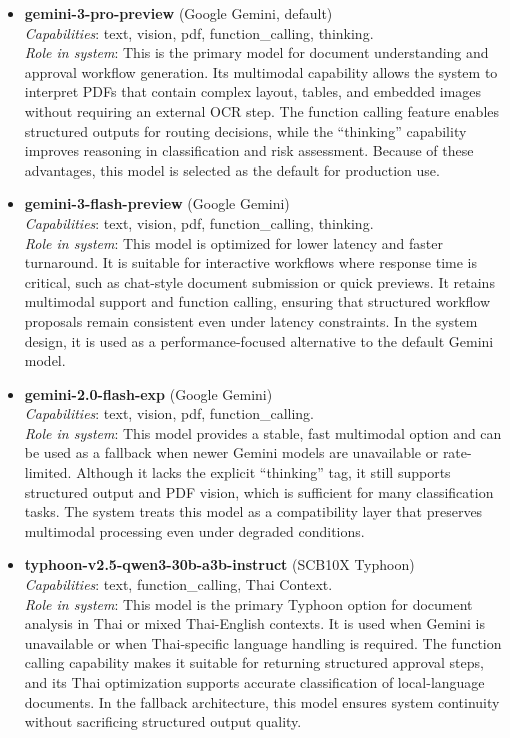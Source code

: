 \documentclass[12pt,oneside,openright,a4paper]{cpe-english-project}
\begin{document}
\begin{itemize}
  \item \textbf{gemini-3-pro-preview} (Google Gemini, default) \\
  \emph{Capabilities}: text, vision, pdf, function\_calling, thinking. \\
  \emph{Role in system}: This is the primary model for document
  understanding and approval workflow generation. Its multimodal
  capability allows the system to interpret PDFs that contain complex
  layout, tables, and embedded images without requiring an external OCR
  step. The function calling feature enables structured outputs for
  routing decisions, while the “thinking” capability improves reasoning
  in classification and risk assessment. Because of these advantages,
  this model is selected as the default for production use.

  \item \textbf{gemini-3-flash-preview} (Google Gemini) \\
  \emph{Capabilities}: text, vision, pdf, function\_calling, thinking. \\
  \emph{Role in system}: This model is optimized for lower latency and
  faster turnaround. It is suitable for interactive workflows where
  response time is critical, such as chat-style document submission or
  quick previews. It retains multimodal support and function calling,
  ensuring that structured workflow proposals remain consistent even
  under latency constraints. In the system design, it is used as a
  performance-focused alternative to the default Gemini model.

  \item \textbf{gemini-2.0-flash-exp} (Google Gemini) \\
  \emph{Capabilities}: text, vision, pdf, function\_calling. \\
  \emph{Role in system}: This model provides a stable, fast multimodal
  option and can be used as a fallback when newer Gemini models are
  unavailable or rate-limited. Although it lacks the explicit “thinking”
  tag, it still supports structured output and PDF vision, which is
  sufficient for many classification tasks. The system treats this model
  as a compatibility layer that preserves multimodal processing even
  under degraded conditions.

  \item \textbf{typhoon-v2.5-qwen3-30b-a3b-instruct} (SCB10X Typhoon) \\
  \emph{Capabilities}: text, function\_calling, Thai Context. \\
  \emph{Role in system}: This model is the primary Typhoon option for
  document analysis in Thai or mixed Thai-English contexts. It is used
  when Gemini is unavailable or when Thai-specific language handling is
  required. The function calling capability makes it suitable for
  returning structured approval steps, and its Thai optimization
  supports accurate classification of local-language documents. In the
  fallback architecture, this model ensures system continuity without
  sacrificing structured output quality.


\end{itemize}
\end{document}
